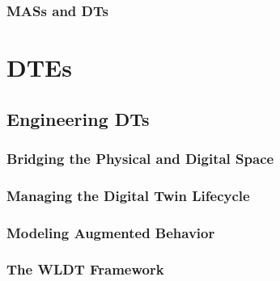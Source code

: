 \documentclass[12pt,a4paper,openright,twoside]{book}
\begin{document}
\section{\aclp{MAS} and \aclp{DT}}


\part{\aclp{DTE}}

\chapter{Engineering \aclp{DT}}
\label{chap:engineering-digital-twins}

\section{Bridging the Physical and Digital Space}

\section{Managing the Digital Twin Lifecycle}

\section{Modeling Augmented Behavior}

\section{The \acl{WLDT} Framework}
\end{document}
